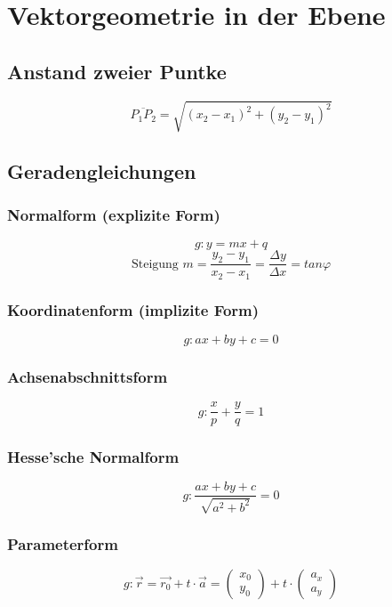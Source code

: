 \section{Vektorgeometrie in der Ebene}

\subsection{Anstand zweier Puntke}
\[ \boxed{ \overline{P_1 P_2} = \sqrt{ (x_2 - x_1)^2 + (y_2 - y_1)^2 } } \]

\subsection{Geradengleichungen}

\subsubsection{Normalform (explizite Form)}
\[ \boxed{ g: y= mx + q }\]
\[ \boxed{ \text{Steigung } m = \frac{y_2 - y_1}{x_2 - x_1} = \frac{\Delta y}{\Delta x}  = tan \varphi } \]

\subsubsection{Koordinatenform (implizite Form)}
\[ \boxed{ g: ax + by + c = 0 } \]

\subsubsection{Achsenabschnittsform}
\[ \boxed{ g: \frac{x}{p} + \frac{y}{q} = 1 } \]

\subsubsection{Hesse'sche Normalform}
\[ \boxed{ g:  \frac{ax + by + c}{\sqrt{ a^2 + b^2 } } = 0 }  \]

\subsubsection{Parameterform}
\[ \boxed{ 
    g: \vec{r} = \vec{r_0} + t \cdot \vec{a}  = 
      \left( 
	\begin{array}{cc} 
	  x_0 \\ y_0
	\end{array}
      \right)
      + t \cdot 
      \left( 
	\begin{array}{cc} 
	  a_x \\ a_y
	\end{array}
      \right)  
   }
\]


